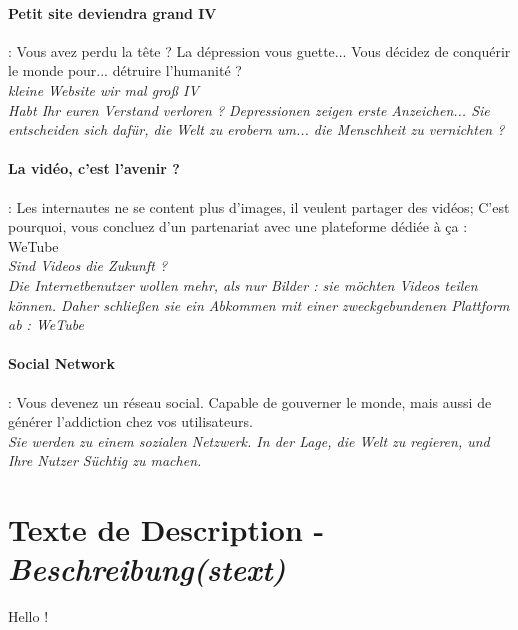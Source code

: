 \documentclass[10pt,a4paper]{article}
\begin{document}
\paragraph{Petit site deviendra grand IV} : Vous avez perdu la tête ? La dépression vous guette... Vous décidez de conquérir le monde pour... détruire l'humanité ?\\
\textit{kleine Website wir mal groß IV}\\
\textit{Habt Ihr euren Verstand verloren ? Depressionen zeigen erste Anzeichen... Sie entscheiden sich dafür, die Welt zu erobern um... die Menschheit zu vernichten ?}


\paragraph{La vidéo, c'est l'avenir ?} : Les internautes ne se content plus d'images, il veulent partager des vidéos; C'est pourquoi, vous concluez d'un partenariat avec une plateforme dédiée à ça : WeTube\\
\textit{Sind Videos die Zukunft ?}\\
\textit{Die Internetbenutzer wollen mehr, als nur Bilder : sie möchten Videos teilen können. Daher schließen sie ein Abkommen mit einer zweckgebundenen Plattform ab : WeTube}


\paragraph{Social Network} : Vous devenez un réseau social. Capable de gouverner le monde, mais aussi de générer l'addiction chez vos utilisateurs.\\
\textit{Sie werden zu einem sozialen Netzwerk. In der Lage, die Welt zu regieren, und Ihre Nutzer Süchtig zu machen.}



\section{Texte de Description -\emph{Beschreibung(stext)}}

Hello !
\end{document}
